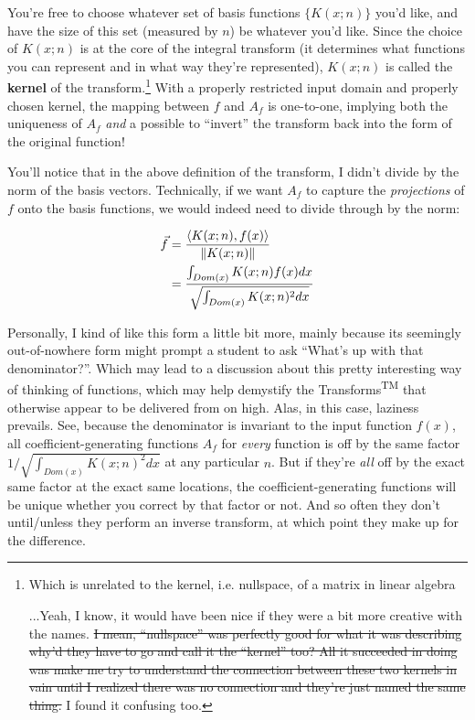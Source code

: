 \documentclass[letterpaper,12pt]{report}
\begin{document}
You're free to choose whatever set of basis functions
\(\{K(x;n)\}\) you'd like, and have the size of this set
(measured by \(n\)) be whatever you'd like.
Since the choice of \(K(x;n)\) is at the core of
the integral transform (it determines what functions you
can represent and in what way they're represented),
\(K(x;n)\) is called the 
\textbf{kernel}
of the transform.\footnote{
  Which is unrelated to the kernel, i.e. nullspace, of a matrix in linear algebra\par
  ...Yeah, I know, it would have been nice if they were a
  bit more creative with the names. 
  \sout{I mean, ``nullspace''
  was perfectly good for what it was describing \textemdash{}
  why'd they have to go and call it the ``kernel'' too?
  All it succeeded in doing was make me try to understand
  the connection between these two kernels in vain until
  I realized there was no connection and they're just
  named the same thing.}
  I found it confusing too.
}
With a properly restricted input domain and properly
chosen kernel, the mapping between \(f\) and \(A_f\)
is one-to-one, implying both the uniqueness of \(A_f\)
\emph{and} a possible to ``invert'' the transform
back into the form of the original function!\par

You'll notice that in the above definition of the transform,
I didn't divide by the norm of the basis vectors.
Technically, if we want \(A_f\) to capture the \emph{projections}
of \(f\) onto the basis functions, we would indeed need
to divide through by the norm:

\[\begin{split}
  \vec{f} &= \frac{\innerprod[K(x;n)][f(x)]}{\norm[K(x;n)]} \\
  &= \frac {\int_{Dom(x)} K(x;n) f(x) dx } {\sqrt{\int_{Dom(x)} K(x;n)^2 dx }}
\end{split}
\]

Personally, I kind of like this form a little bit more, mainly
because its seemingly out-of-nowhere form might prompt a student
to ask ``What's up with that denominator?''. Which
may lead to a discussion about 
this pretty interesting way of thinking of functions,
which may help demystify the Transforms\textsuperscript{TM} 
that otherwise appear to be delivered from on high.
Alas, in this case, laziness prevails.
See, because the denominator is invariant to the input function
\(f(x)\), all coefficient-generating functions \(A_f\) for
\emph{every} function is off by the same factor
\(1/\sqrt{\int_{Dom(x)} K(x;n)^2 dx}\) at any particular \(n\).
But if they're \emph{all} off by the exact same factor at the
exact same locations,
the coefficient-generating functions will be unique
whether you correct by that factor or not.
And so often they don't until/unless they perform an
inverse transform, 
at which point they make up for the difference.
\end{document}
